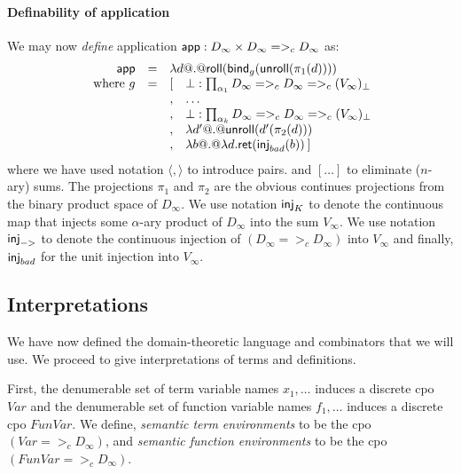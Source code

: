 \documentclass[preprint,nocopyrightspace,draft]{sigplanconf}
\begin{document}
\paragraph{Definability of application}
We may now {\em define} application $\mathsf{app} : D_\infty \times D_\infty =>_c D_\infty$ as: 
{\setlength{\arraycolsep}{2pt}
\[\begin{array}{rcll}
   \dapp & = & \multicolumn{2}{l}{\dlambda d @.@ \roll(\bind_g (\unroll (\pi_1(d))))} \\
   \text{ where } g & = &  [ & \bot : \prod_{\ar_1}{D_\infty} =>_c D_\infty =>_c (V_\infty)_\bot \\
                    &   &  , & \ldots \\
                    &   &  , & \bot : \prod_{\ar_k}{D_\infty} =>_c D_\infty =>_c (V_\infty)_\bot \\
                    &   &  , & \dlambda d' @.@ \unroll(d'(\pi_2(d))) \\
                    &   &  , & \dlambda b @.@ \dlambda d. \ret(\inj{bad}(b))\hspace{2pt} ] 
\end{array}\]}%
where we have used notation $\langle , \rangle$ to introduce pairs. and $[\ldots]$ to eliminate ($n$-ary) sums.
The projections $\pi_1$ and $\pi_2$ are the obvious continues projections from the binary product space of $D_{\infty}$. 
We use notation $\mathsf{inj}_{K}$ to denote the continuous map that injects some $\alpha$-ary product of $D_{\infty}$ into the sum $V_{\infty}$.
We use notation $\mathsf{inj}_{->}$ to denote the continuous injection of $(D_{\infty} =>_c D_{\infty})$ into $V_{\infty}$ and finally, 
$\mathsf{inj}_{bad}$ for the unit injection into $V_{\infty}$.


\subsection{Interpretations}
\newcommand{\VarCpo}{\textit{Var}}
\newcommand{\FVarCpo}{\textit{FunVar}}
\newcommand{\interp}[3]{[\![#1]\!]_{\langle {#2},{#3}\rangle}}
\newcommand{\dbrace}[1]{[\![#1]\!]}


We have now defined the domain-theoretic language and combinators that we will use. 
We proceed to give interpretations of terms and definitions. 

First, the denumerable set of term variable names $x_1,\ldots$ induces a discrete 
cpo $\VarCpo$  and the denumerable set of function variable names $f_1,\ldots$ induces a discrete 
cpo $\FVarCpo$. We define, {\em semantic term environments} to be the cpo $(\VarCpo =>_c D_{\infty})$, 
and {\em semantic function environments} to be the cpo $(\FVarCpo =>_c D_{\infty})$. 
\end{document}
